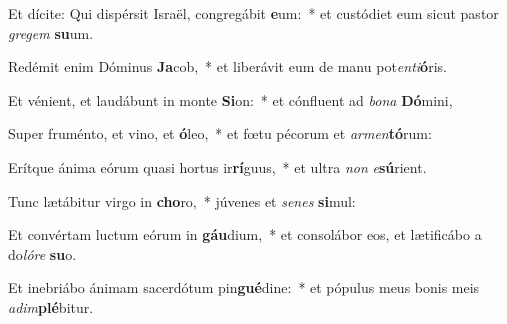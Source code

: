 \item Et dícite: Qui dispérsit Israël, congregábit \textbf{e}um:~* et custódiet eum sicut pastor \textit{gre}\textit{gem} \textbf{su}um.
\item Redémit enim Dóminus \textbf{Ja}cob,~* et liberávit eum de manu pot\textit{en}\textit{ti}\textbf{ó}ris.
\item Et vénient, et laudábunt in monte \textbf{Si}on:~* et cónfluent ad \textit{bo}\textit{na} \textbf{Dó}mini,
\item Super fruménto, et vino, et \textbf{ó}leo,~* et fœtu pécorum et \textit{ar}\textit{men}\textbf{tó}rum:
\item Erítque ánima eórum quasi hortus ir\textbf{rí}guus,~* et ultra \textit{non} \textit{e}\textbf{sú}rient.
\item Tunc lætábitur virgo in \textbf{cho}ro,~* júvenes et \textit{se}\textit{nes} \textbf{si}mul:
\item Et convértam luctum eórum in \textbf{gáu}dium,~* et consolábor eos, et lætificábo a do\textit{ló}\textit{re} \textbf{su}o.
\item Et inebriábo ánimam sacerdótum pin\textbf{gué}dine:~* et pópulus meus bonis meis \textit{ad}\textit{im}\textbf{plé}bitur.
